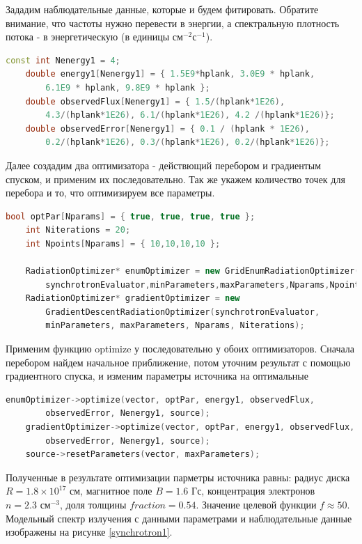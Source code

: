 Зададим наблюдательные данные, которые и будем фитировать. Обратите внимание, что частоты нужно перевести в энергии, а спектральную плотность потока - в энергетическую (в единицы $\text{см}^{-2}\text{с}^{-1}$).
\begin{lstlisting}[language=c++]
    const int Nenergy1 = 4;
    double energy1[Nenergy1] = { 1.5E9*hplank, 3.0E9 * hplank, 
    	6.1E9 * hplank, 9.8E9 * hplank };
    double observedFlux[Nenergy1] = { 1.5/(hplank*1E26), 
    	4.3/(hplank*1E26), 6.1/(hplank*1E26), 4.2 /(hplank*1E26)};
    double observedError[Nenergy1] = { 0.1 / (hplank * 1E26), 
    	0.2/(hplank*1E26), 0.3/(hplank*1E26), 0.2/(hplank*1E26)};
\end{lstlisting}
Далее создадим два оптимизатора - действющий перебором и градиентым спуском, и применим их последовательно. Так же укажем количество точек для перебора и то, что оптимизируем все параметры.
\begin{lstlisting}[language=c++]
    bool optPar[Nparams] = { true, true, true, true };
    int Niterations = 20;
    int Npoints[Nparams] = { 10,10,10,10 };
    
    RadiationOptimizer* enumOptimizer = new GridEnumRadiationOptimizer(
        synchrotronEvaluator,minParameters,maxParameters,Nparams,Npoints);
    RadiationOptimizer* gradientOptimizer = new 
        GradientDescentRadiationOptimizer(synchrotronEvaluator, 
        minParameters, maxParameters, Nparams, Niterations);
\end{lstlisting}
Применим функцию optimize у последовательно у обоих оптимизаторов. Сначала перебором найдем начальное приближение, потом уточним результат с помощью градиентного спуска, и изменим параметры источника на оптимальные
\begin{lstlisting}[language=c++]
    enumOptimizer->optimize(vector, optPar, energy1, observedFlux, 
        observedError, Nenergy1, source);
    gradientOptimizer->optimize(vector, optPar, energy1, observedFlux, 
        observedError, Nenergy1, source);
    source->resetParameters(vector, maxParameters);
\end{lstlisting}
Полученные в результате оптимизации парметры источника равны: радиус диска $R = 1.8\times10^17 \text{ см}$, магнитное поле $B = 1.6 \text{ Гс}$, концентрация электронов $n = 2.3 \text{ см}^{-3}$, доля толщины $fraction = 0.54 $. Значение целевой функции $f \approx 50$. Модельный спектр излучения  с данными параметрами и наблюдательные данные изображены на рисунке \ref{synchrotron1}.
